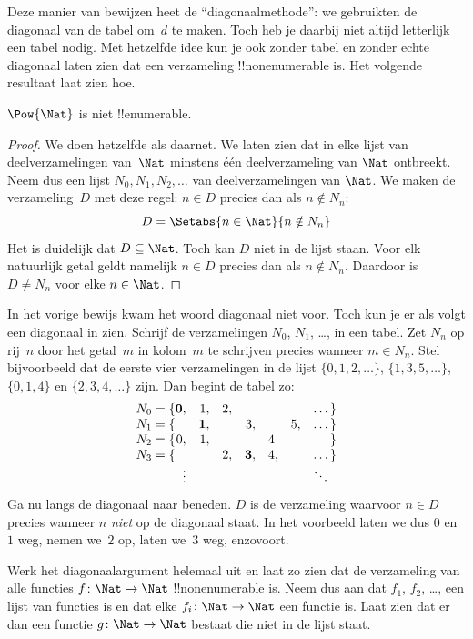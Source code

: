 \documentclass[../../../include/open-logic-section]{subfiles}
\begin{document}
\begin{explain}
Deze manier van bewijzen heet de ``diagonaalmethode'': we gebruikten de
diagonaal van de tabel om~$d$ te maken. Toch heb je daarbij niet altijd
letterlijk een tabel nodig. Met hetzelfde idee kun je ook zonder tabel
en zonder echte diagonaal laten zien dat een
verzameling !!{nonenumerable} is. Het volgende resultaat laat zien hoe.
\end{explain}

\begin{thm}
$\Pow{\Nat}$ is niet !!{enumerable}.
\end{thm}

\begin{proof}
We doen hetzelfde als daarnet. We laten zien dat in elke lijst van
deelverzamelingen van~$\Nat$ minstens één deelverzameling van $\Nat$
ontbreekt. Neem dus een lijst $N_0, N_1, N_2, \ldots$ van
deelverzamelingen van $\Nat$. We maken de verzameling~$D$ met deze
regel: $n \in D$ precies dan als $n \notin N_{n}$:
\[
D = \Setabs{n \in \Nat}{n \notin N_n}
\]
Het is duidelijk dat $D\subseteq \Nat$. Toch kan $D$ niet in de lijst
staan. Voor elk natuurlijk getal geldt namelijk $n \in D$ precies dan als
$n\notin N_n$. Daardoor is $D \neq N_n$ voor elke $n \in \Nat$.
\end{proof}

\begin{explain}
In het vorige bewijs kwam het woord diagonaal niet voor. Toch kun je
er als volgt een diagonaal in zien. Schrijf de verzamelingen $N_0$,
$N_1$, \dots, in een tabel. Zet $N_n$ op rij~$n$ door het getal~$m$ in
kolom~$m$ te schrijven precies wanneer $m \in N_n$. Stel bijvoorbeeld dat de eerste
vier verzamelingen in de lijst $\{0,1,2,\dots\}$,
$\{1, 3, 5, \dots\}$, $\{0,1,4\}$ en $\{2,3,4,\dots\}$ zijn. Dan begint
de tabel zo:
\[
\begin{array}{r@{}rrrrrrr}
  N_0 = \{ & \mathbf{0}, & 1, & 2, & & & & \dots\}\\
  N_1 = \{ &  & \mathbf{1}, &  & 3, &  & 5, & \dots\}\\
  N_2 = \{ & 0, & 1, &  &  & 4\phantom{,} &  & \}\\
  N_3 = \{ &  &  & 2, & \mathbf{3}, & 4, & & \dots\}\\
  &\vdots & & & & & & \ddots\phantom{\}}
  \end{array}
\]
Ga nu langs de diagonaal naar beneden. $D$ is de verzameling waarvoor
$n \in D$ precies wanneer $n$ \emph{niet} op de diagonaal staat. In het voorbeeld laten
we dus $0$ en $1$ weg, nemen we~$2$ op, laten we~$3$ weg, enzovoort.
\end{explain}

\begin{prob}
Werk het diagonaalargument helemaal uit en laat zo zien dat de
verzameling van alle functies $f \colon \Nat \to \Nat$
!!{nonenumerable} is. Neem dus aan dat $f_1$, $f_2$, \dots, een lijst
van functies is en dat elke $f_i\colon \Nat \to \Nat$ een functie is.
Laat zien dat er dan een functie $g \colon \Nat \to \Nat$ bestaat die
niet in de lijst staat.
\end{prob}
\end{document}
